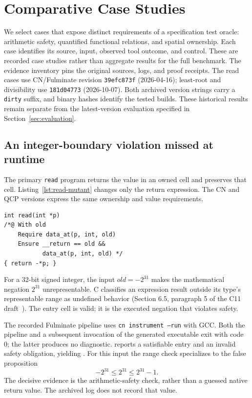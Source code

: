 \section{Comparative Case Studies}
\label{sec:case-studies}
We select cases that expose distinct requirements of a specification test
oracle: arithmetic safety, quantified functional relations, and spatial
ownership. Each case identifies its source, input, observed tool outcome,
and control. These are recorded case studies rather than aggregate results
for the full benchmark. The evidence inventory pins the original sources,
logs, and proof receipts. The read cases use CN/Fulminate revision
\texttt{39efc873f} (2026-04-16); least-root and divisibility use
\texttt{181d04773} (2026-10-07). Both archived version strings carry a
\texttt{dirty} suffix, and binary hashes identify the tested builds.
These historical results remain separate from the latest-version evaluation
specified in Section~\ref{sec:evaluation}.

\subsection{An integer-boundary violation missed at runtime}
\label{sec:read-min}
The primary \texttt{read} program returns the value in an owned cell and
preserves that cell. Listing~\ref{lst:read-mutant} changes only the return
expression. The CN and QCP versions express the same ownership and value
requirements.
\begin{lstlisting}[caption={Negation mutant of read. The contract still requires the original value.},label={lst:read-mutant}]
int read(int *p)
/*@ With old
    Require data_at(p, int, old)
    Ensure __return == old &&
           data_at(p, int, old) */
{ return -*p; }
\end{lstlisting}
For a 32-bit signed integer, the input $\mathit{old}=-2^{31}$ makes the
mathematical negation $2^{31}$ unrepresentable. C classifies an expression
result outside its type's representable range as undefined behavior
(Section 6.5, paragraph 5 of the C11 draft~\cite{iso2011c}). The entry
cell is valid; it is the executed negation that violates safety.

The recorded Fulminate pipeline uses \texttt{cn instrument --run} with GCC.
Both the pipeline and a subsequent invocation of the generated executable
exit with code 0; the latter produces no diagnostic. \tespec{} reports a
satisfiable entry and an invalid safety obligation, yielding \fail{}.
For this input the range check specializes to the false proposition
\[
                    -2^{31}\le 2^{31}\le 2^{31}-1.
\]
The decisive evidence is the arithmetic-safety check, rather than a guessed
native return value. The archived log does not record that value.

